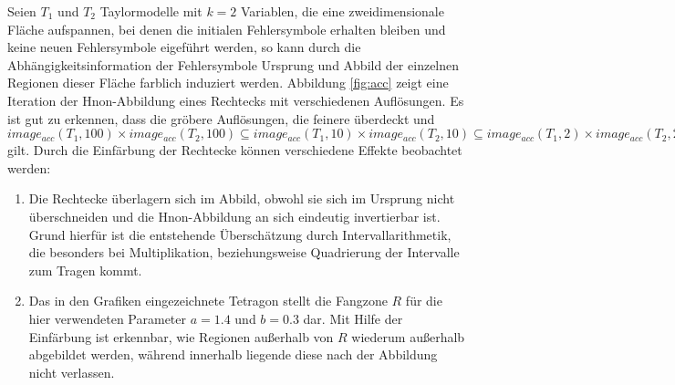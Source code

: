 Seien $T_1$ und $T_2$ Taylormodelle mit $k=2$ Variablen, die eine zweidimensionale Fläche aufspannen, bei denen die initialen Fehlersymbole erhalten bleiben und keine neuen Fehlersymbole eigeführt werden, so kann durch die Abhängigkeitsinformation der Fehlersymbole Ursprung und Abbild der einzelnen Regionen dieser Fläche farblich induziert werden. Abbildung \ref{fig:acc} zeigt eine Iteration der H\e non-Abbildung eines Rechtecks mit verschiedenen Auflösungen. Es ist gut zu erkennen, dass die gröbere Auflösungen, die feinere überdeckt und $image_{acc}(T_1,100)\times image_{acc}(T_2,100) \subseteq image_{acc}(T_1,10)\times image_{acc}(T_2,10) \subseteq image_{acc}(T_1,2)\times image_{acc}(T_2,2) $ gilt. Durch die Einfärbung der Rechtecke können verschiedene Effekte beobachtet werden:
\begin{enumerate}
 \item Die Rechtecke überlagern sich im Abbild, obwohl sie sich im Ursprung nicht überschneiden und die H\e non-Abbildung an sich eindeutig invertierbar ist. Grund hierfür ist die entstehende Überschätzung durch Intervallarithmetik, die besonders bei Multiplikation, beziehungsweise Quadrierung der Intervalle zum Tragen kommt.
 \item Das in den Grafiken eingezeichnete Tetragon stellt die Fangzone $R$ für die hier verwendeten Parameter $a=1.4$ und $b=0.3$ dar. Mit Hilfe der Einfärbung ist erkennbar, wie Regionen außerhalb von $R$ wiederum außerhalb abgebildet werden, während innerhalb liegende diese nach der Abbildung nicht verlassen.
\end{enumerate}










